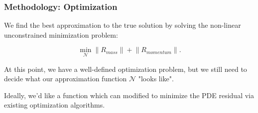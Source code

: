 \begin{frame}
    \frametitle{Methodology: Optimization}

    We find the best approximation to the true solution by solving the non-linear unconstrained minimization problem:

    $$
    \min_{\mathcal{N}} {\lVert R_{mass} \rVert + \lVert R_{momentum} \rVert}.
    $$

    \bigskip
    \pause

    At this point, we have a well-defined optimization problem, but we still need to decide what our approximation 
    function $\mathcal{N}$ "looks like". 

    \bigskip
    \pause

    Ideally, we'd like a function which can modified to minimize the PDE residual via existing optimization algorithms.
\end{frame}